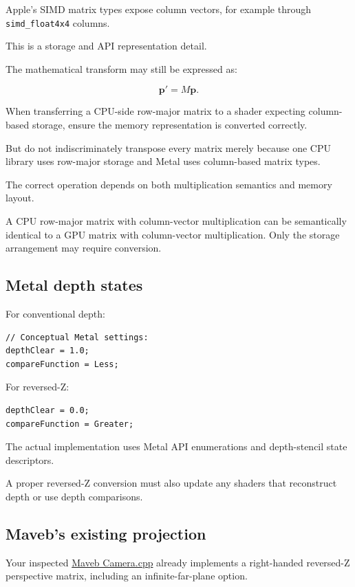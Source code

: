 Apple's SIMD matrix types expose column vectors, for example through \texttt{simd\_float4x4} columns.

This is a storage and API representation detail.

The mathematical transform may still be expressed as:

\[
 \mathbf p'=M\mathbf p.
\]

When transferring a CPU-side row-major matrix to a shader expecting column-based storage, ensure the memory representation is converted correctly.

But do not indiscriminately transpose every matrix merely because one CPU library uses row-major storage and Metal uses column-based matrix types.

The correct operation depends on both multiplication semantics and memory layout.

A CPU row-major matrix with column-vector multiplication can be semantically identical to a GPU matrix with column-vector multiplication. Only the storage arrangement may require conversion.

\subsection{Metal depth states}\label{02-foundations-ii-ch033-metal-depth-states}

For conventional depth:

\begin{verbatim}
// Conceptual Metal settings:
depthClear = 1.0;
compareFunction = Less;
\end{verbatim}

For reversed-Z:

\begin{verbatim}
depthClear = 0.0;
compareFunction = Greater;
\end{verbatim}

The actual implementation uses Metal API enumerations and depth-stencil state descriptors.

A proper reversed-Z conversion must also update any shaders that reconstruct depth or use depth comparisons.

\subsection{Maveb's existing projection}\label{02-foundations-ii-ch033-mavebs-existing-projection}

Your inspected \href{https://github.com/swayam8624/Maveb/blob/main/engine/scene/src/Camera.cpp?utm_source=chatgpt.com}{Maveb Camera.cpp} already implements a right-handed reversed-Z perspective matrix, including an infinite-far-plane option.

